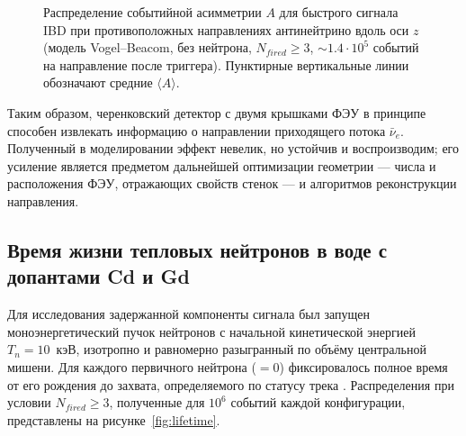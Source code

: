 \documentclass[a4paper,12pt]{extarticle}
\newcommand{\macrocmd}[1]{\texttt{\seqsplit{#1}}}
\begin{document}
\begin{figure}[h!]
\centering
{}
\caption{Распределение событийной асимметрии $A$ для быстрого сигнала IBD при противоположных направлениях антинейтрино вдоль оси $z$ (модель Vogel--Beacom, без нейтрона, $N_{fired}\ge 3$, $\sim 1.4\cdot 10^5$ событий на направление после триггера). Пунктирные вертикальные линии обозначают средние $\langle A\rangle$.}
\label{fig:asym_nu_dirs}
\end{figure}

Таким образом, черенковский детектор с двумя крышками ФЭУ в принципе способен извлекать информацию о направлении приходящего потока $\bar{\nu}_e$. Полученный в моделировании эффект невелик, но устойчив и воспроизводим; его усиление является предметом дальнейшей оптимизации геометрии --- числа и расположения ФЭУ, отражающих свойств стенок --- и алгоритмов реконструкции направления.

\subsection{Время жизни тепловых нейтронов в воде с допантами Cd и Gd}
Для исследования задержанной компоненты сигнала был запущен моноэнергетический пучок нейтронов с начальной кинетической энергией $T_n=10$~кэВ, изотропно и равномерно разыгранный по объёму центральной мишени. Для каждого первичного нейтрона (\macrocmd{ParentID}$=0$) фиксировалось полное время от его рождения до захвата, определяемого по статусу трека \macrocmd{fStopAndKill}. Распределения при условии $N_{fired}\ge 3$, полученные для $10^6$ событий каждой конфигурации, представлены на рисунке~\ref{fig:lifetime}.
\end{document}
